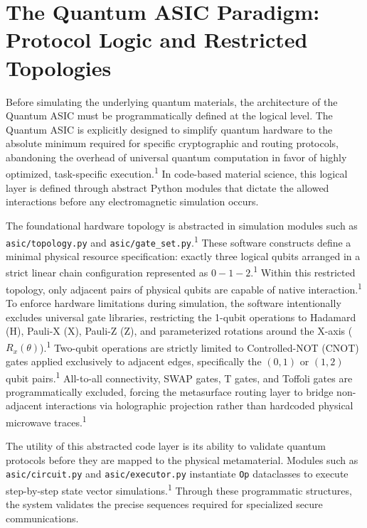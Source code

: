 \documentclass[11pt, a4paper]{article}
\begin{document}
\section{The Quantum ASIC Paradigm: Protocol Logic and Restricted Topologies}

Before simulating the underlying quantum materials, the architecture of the Quantum ASIC must be programmatically defined at the logical level. The Quantum ASIC is explicitly designed to simplify quantum hardware to the absolute minimum required for specific cryptographic and routing protocols, abandoning the overhead of universal quantum computation in favor of highly optimized, task-specific execution.\textsuperscript{1} In code-based material science, this logical layer is defined through abstract Python modules that dictate the allowed interactions before any electromagnetic simulation occurs.

The foundational hardware topology is abstracted in simulation modules such as \texttt{asic/topology.py} and \texttt{asic/gate\_set.py}.\textsuperscript{1} These software constructs define a minimal physical resource specification: exactly three logical qubits arranged in a strict linear chain configuration represented as $0 - 1 - 2$.\textsuperscript{1} Within this restricted topology, only adjacent pairs of physical qubits are capable of native interaction.\textsuperscript{1} To enforce hardware limitations during simulation, the software intentionally excludes universal gate libraries, restricting the 1-qubit operations to Hadamard (H), Pauli-X (X), Pauli-Z (Z), and parameterized rotations around the X-axis ($R_x(\theta)$).\textsuperscript{1} Two-qubit operations are strictly limited to Controlled-NOT (CNOT) gates applied exclusively to adjacent edges, specifically the $(0,1)$ or $(1,2)$ qubit pairs.\textsuperscript{1} All-to-all connectivity, SWAP gates, T gates, and Toffoli gates are programmatically excluded, forcing the metasurface routing layer to bridge non-adjacent interactions via holographic projection rather than hardcoded physical microwave traces.\textsuperscript{1}

The utility of this abstracted code layer is its ability to validate quantum protocols before they are mapped to the physical metamaterial. Modules such as \texttt{asic/circuit.py} and \texttt{asic/executor.py} instantiate \texttt{Op} dataclasses to execute step-by-step state vector simulations.\textsuperscript{1} Through these programmatic structures, the system validates the precise sequences required for specialized secure communications.
\end{document}

